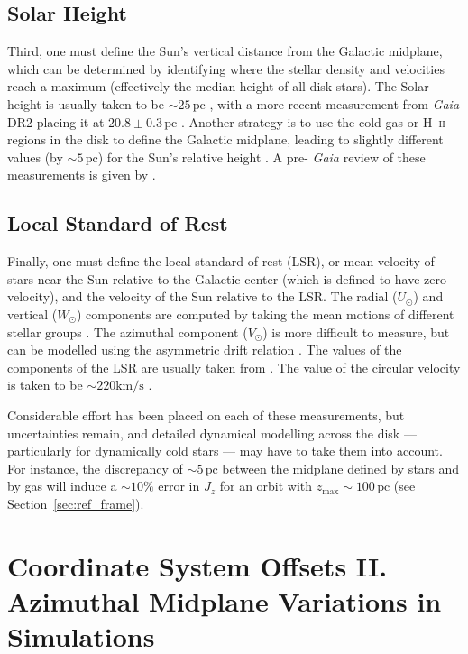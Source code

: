 \documentclass[twocolumn]{aastex62}
\newcommand{\pc}{\text{pc}}
\newcommand{\kms}{\text{km}/\text{s}}
\begin{document}
\subsection{Solar Height}
Third, one must define the Sun's vertical distance from the Galactic midplane,
which can be determined by identifying where the stellar density and
velocities reach a maximum (effectively the median height of all disk stars).
The Solar height is usually taken to be $\sim 25\,\pc$
\citep{2001ApJ...553..184C}, with a more recent measurement from {\em Gaia}
DR2 placing it at $20.8 \pm 0.3\,\pc$ \citep{2019MNRAS.482.1417B}. Another
strategy is to use the cold gas or H~\textsc{ii} regions in the disk to define
the Galactic midplane, leading to slightly different values (by $\sim 5\,\pc$)
for the Sun's relative height \citep[e.g.][]{2019ApJ...871..145A}. A pre-{\em
Gaia} review of these measurements is given by \citet{2016ARAA..54..529B}.

\subsection{Local Standard of Rest}
Finally, one must define the local standard of rest (LSR), or mean velocity of
stars near the Sun relative to the Galactic center (which is defined to have
zero velocity), and the velocity of the Sun relative to the LSR. The radial
($U_{\odot}$) and vertical ($W_{\odot}$) components are computed by taking the
mean motions of different stellar groups \citep[e.g.][]{2012MNRAS.427..274S}.
The azimuthal component ($V_{\odot}$) is more difficult to measure, but can be
modelled using the asymmetric drift relation \citep{2008gady.book.....B}. The
values of the components of the LSR are usually taken from
\citet{2010MNRAS.403.1829S}. The value of the circular velocity is taken to be
$\sim 220\kms$ \citep[e.g.][]{2012ApJ...759..131B}.

\vspace{6pt}

Considerable effort has been placed on each of these measurements, but
uncertainties remain, and detailed dynamical modelling across the disk ---
particularly for dynamically cold stars --- may have to take them into
account. For instance, the discrepancy of $\sim 5\,\pc$ between the midplane
defined by stars and by gas will induce a $\sim10\%$ error in $J_z$ for an
orbit with $z_{\text{max}}\sim100\,\pc$ (see Section~\ref{sec:ref_frame}).

\section{Coordinate System Offsets II. Azimuthal Midplane Variations in
Simulations}
\label{sec:local_fire}
\end{document}
